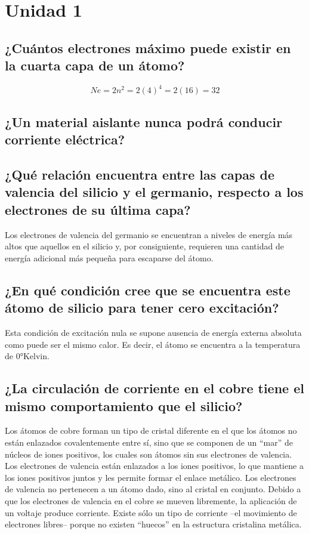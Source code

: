 \section{Unidad 1}

\subsection{¿Cuántos electrones máximo puede existir en la cuarta capa de un átomo?}
\[
Ne = 2n^2 = 2(4)^4 = 2(16) = 32
\]

\subsection{¿Un material aislante nunca podrá conducir corriente eléctrica?}

\subsection{¿Qué relación encuentra entre las capas de valencia del silicio y el germanio, respecto a los electrones de su última capa?}

Los electrones de valencia del germanio se encuentran a niveles de energía más altos que aquellos en el silicio y, por consiguiente, requieren una cantidad de energía adicional más pequeña para escaparse del átomo.

\subsection{¿En qué condición cree que se encuentra este átomo de silicio para tener cero excitación?}

Esta condición de excitación nula se supone ausencia de energía externa absoluta como puede ser el mismo calor. Es decir, el átomo se encuentra a la temperatura de 0°Kelvin.

\subsection{¿La circulación de corriente en el cobre tiene el mismo comportamiento que el silicio?}

Los átomos de cobre forman un tipo de cristal diferente en el que los átomos no están enlazados covalentemente entre sí, sino que se componen de un “mar” de núcleos de iones positivos, los cuales son átomos sin sus electrones de valencia. Los electrones de valencia están enlazados a los iones positivos, lo que mantiene a los iones positivos juntos y les permite formar el enlace metálico. Los electrones de valencia no pertenecen a un átomo dado, sino al cristal en conjunto. Debido a que los electrones de valencia en el cobre se mueven libremente, la aplicación de un voltaje produce corriente. Existe sólo un tipo de corriente –el movimiento de electrones libres– porque no existen “huecos” en la estructura cristalina metálica.

